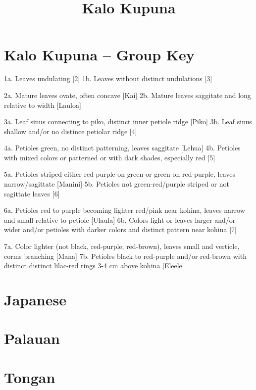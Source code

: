 \documentclass[
]{article}
\title{Kalo Kupuna}
\author{}
\date{\vspace{-2.5em}}
\begin{document}
\maketitle

\section{Kalo Kupuna -- Group Key}\label{kalo-kupuna-group-key}

1a. Leaves undulating {[}2{]} 1b. Leaves without distinct undulations
{[}3{]}

2a. Mature leaves ovate, often concave {[}Kai{]} 2b. Mature leaves
saggitate and long relative to width {[}Lauloa{]}

3a. Leaf sinus connecting to piko, distinct inner petiole ridge
{[}Piko{]} 3b. Leaf sinus shallow and/or no distince petiolar ridge
{[}4{]}

4a. Petioles green, no distinct patterning, leaves saggitate {[}Lehua{]}
4b. Petioles with mixed colors or patterned or with dark shades,
especially red {[}5{]}

5a. Petioles striped either red-purple on green or green on red-purple,
leaves narrow/sagittate {[}Manini{]} 5b. Petioles not green-red/purple
striped or not sagittate leaves {[}6{]}

6a. Petioles red to purple becoming lighter red/pink near kohina, leaves
narrow and small relative to petiole {[}Ulaula{]} 6b. Colors light or
leaves larger and/or wider and/or petioles with darker colors and
distinct pattern near kohina {[}7{]}

7a. Color lighter (not black, red-purple, red-brown), leaves small and
verticle, corms branching {[}Mana{]} 7b. Petioles black to red-purple
and/or red-brown with distinct distinct lilac-red rings 3-4 cm above
kohina {[}Eleele{]}

\section{Japanese}\label{japanese}

\section{Palauan}\label{palauan}

\section{Tongan}\label{tongan}
\end{document}
